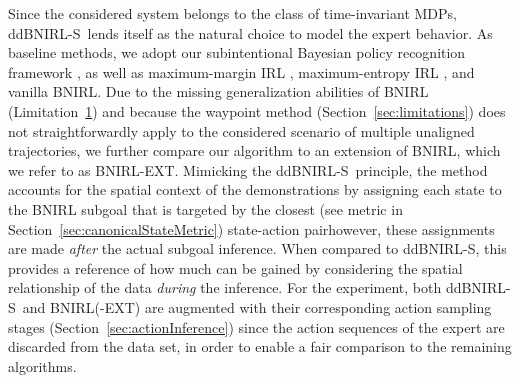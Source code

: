 \documentclass[twoside,11pt]{article}
\newcommand{\nachschub}[1]{\Emdash*#1}
\newcommand{\ddBNIRLS}{\mbox{ddBNIRL-S}}
\begin{document}
Since the considered system belongs to the class of time-invariant MDPs,
%
%
\ddBNIRLS\  lends itself as the natural choice to model the expert behavior.
As baseline methods, we %
adopt our %
subintentional Bayesian policy recognition framework %
 \citep[BPR,][]{sosic2018pami}, as well as maximum-margin IRL \citep{abbeel2004apprenticeship}, maximum-entropy IRL \citep{ziebart2008maximum}, and vanilla BNIRL. %
Due to the missing generalization abilities of BNIRL (Limitation~\hyperref[phantom:lim1]{1}) and because the waypoint method (Section~\ref{sec:limitations}) does not straightforwardly apply to the considered scenario of multiple unaligned trajectories, we further compare our algorithm to an extension of BNIRL, which we refer to as BNIRL-EXT. Mimicking the \ddBNIRLS\ principle, %
the method %
accounts for the spatial context of the demonstrations by assigning each state to the BNIRL subgoal %
that is targeted by the closest %
(see metric in Section~\ref{sec:canonicalStateMetric}) state-action pair\nachschub{however,  these assignments are made 
\textit{after} the actual subgoal inference.} When compared to ddBNIRL-S, this provides a reference of how much can be %
%
gained by %
considering the spatial relationship of the data %
\textit{during} the inference. For the experiment, both \ddBNIRLS\  and BNIRL(-EXT) are augmented with their corresponding action sampling stages (Section~\ref{sec:actionInference}) since the action sequences of the expert are discarded from the data set, in order to enable a fair comparison to the remaining algorithms.
%
%
%
\end{document}
